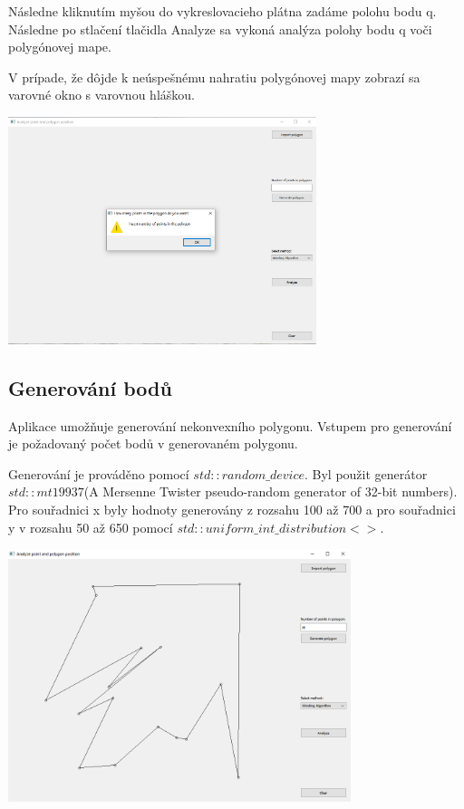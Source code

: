 \documentclass[12pt]{article}
\begin{document}
Následne kliknutím myšou do vykreslovacieho plátna zadáme polohu bodu q. Následne po stlačení tlačidla Analyze sa vykoná analýza polohy bodu q voči polygónovej mape.  

V prípade, že dôjde k neúspešnému nahratiu polygónovej mapy zobrazí sa varovné okno s varovnou hláškou.

\begin{center}
   \includegraphics[width=9cm]{./img/warning.png}
\end{center}

\subsection{Generování bodů}
Aplikace umožňuje generování nekonvexního polygonu. Vstupem pro generování je požadovaný počet bodů v generovaném polygonu.

Generování je prováděno pomocí $std::random\_device$. Byl použit generátor $std::mt19937$(A Mersenne Twister pseudo-random generator of 32-bit numbers). Pro souřadnici x byly hodnoty generovány z rozsahu 100 až 700 a pro souřadnici y v rozsahu 50 až 650 pomocí $std::uniform\_int\_distribution<>$.

\begin{center}
   \includegraphics[width=10cm]{./img/generate.png}
\end{center}
\end{document}
